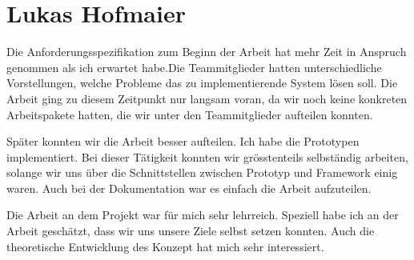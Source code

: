 
\section{Lukas Hofmaier}


Die Anforderungsspezifikation zum Beginn der Arbeit hat mehr Zeit in Anspruch genommen als ich erwartet habe.Die Teammitglieder hatten unterschiedliche Vorstellungen, welche Probleme das zu implementierende System lösen soll. Die Arbeit ging zu diesem Zeitpunkt nur langsam voran, da wir noch keine konkreten Arbeitspakete hatten, die wir unter den Teammitglieder aufteilen konnten.

Später konnten wir die Arbeit besser aufteilen. Ich habe die Prototypen implementiert. Bei dieser Tätigkeit konnten wir grösstenteils selbständig arbeiten, solange wir uns über die Schnittstellen zwischen Prototyp und Framework einig waren. Auch bei der Dokumentation war es einfach die Arbeit aufzuteilen.

Die Arbeit an dem Projekt war für mich sehr lehrreich. Speziell habe ich an der Arbeit geschätzt, dass wir uns unsere Ziele selbst setzen konnten. Auch die theoretische Entwicklung des Konzept hat mich sehr interessiert.

